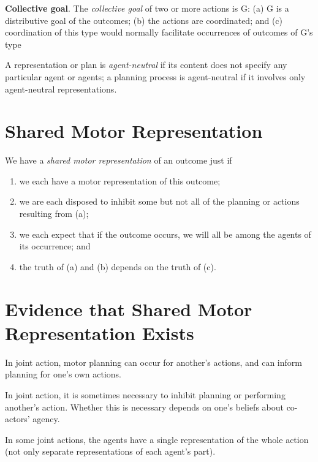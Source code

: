 \documentclass[11pt]{extarticle}
\begin{document}
\begin{multicols}{3}
\textbf{Collective goal}.  The \emph{collective goal} of two or more actions is G:
(a) G is a distributive goal of the outcomes;
(b) the actions are coordinated; and 
(c) coordination of this type would normally  facilitate occurrences of outcomes of G's type


A representation or plan is \emph{agent-neutral} if its content does not specify any particular agent or agents; a planning process is agent-neutral if it involves only agent-neutral representations.


\section{Shared Motor Representation}

We have a \emph{shared motor representation} of an outcome just if 
\begin{enumerate}[label=\emph{\alph*}),itemsep=0pt,topsep=0pt]
\item we each have a motor representation of this outcome; 
\item we are each disposed to inhibit some but not all of the planning or actions resulting from (a);
\item  we each expect that if the outcome occurs, we will all be among the agents of its occurrence; and
\item the truth of (a) and (b) depends on the truth of (c).
\end{enumerate}

%



\section{Evidence that Shared Motor %
Representation Exists}

In joint action, motor planning can occur for another's actions,\citep{kourtis:2012_predictive} and can inform planning for one's own actions.\citep{vesper:2012_jumping}  %

In joint action, it is sometimes necessary to inhibit planning or performing another's action.\citep{sebanz:2006_twin_peaks} 
Whether this is necessary depends on one's beliefs about co-actors' agency.\citep{tsai:2008_action}

In some joint actions, the agents have a single representation of the whole action (not only separate representations of each agent's part).\citep{tsai:2011_groop_effect}



\end{multicols}
\end{document}
